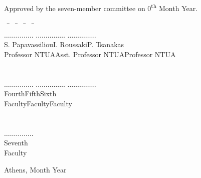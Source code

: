 \begin{titlepage}
\begin{tabbing}
  \> Approved by the seven-member committee on 0\textsuperscript{th} Month Year.\> \\
\end{tabbing}

\begin{tabbing}
~ \hskip 0cm \= ~ \hskip 1cm \= ~ \hskip 4cm \= ~ \hskip 4cm \=\kill %
\> \> \> \> \\
\> \>$\ldots\ldots\ldots\ldots\ldots$ \>$\ldots\ldots\ldots\ldots\ldots$ \>$\ldots\ldots\ldots\ldots\ldots$ \\
\> \>S. Papavassiliou\>I. Roussaki\>P. Tsanakas\\
\> \>Professor NTUA\>Asst. Professor NTUA\>Professor NTUA\\%
\> \> \> \> \\
\> \> \> \> \\
\> \>$\ldots\ldots\ldots\ldots\ldots$ \>$\ldots\ldots\ldots\ldots\ldots$ \>$\ldots\ldots\ldots\ldots\ldots$ \\

\> \>Fourth\>Fifth\>Sixth\\
\> \>Faculty\>Faculty\>Faculty\\
\> \> \> \> \\
\> \> \> \> \\
\> \> \>$\ldots\ldots\ldots\ldots\ldots$ \\ 
\> \> \>Seventh\> \\
\> \> \>Faculty\> \\
\end{tabbing}

\begin{center}
  \small{Athens, Month Year}
\end{center}

\end{titlepage}
